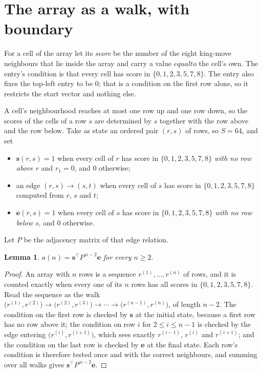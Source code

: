 \documentclass[11pt,a4paper]{article}
\theoremstyle{plain}
\newtheorem{lemma}[theorem]{Lemma}
\theoremstyle{definition}
\begin{document}
\section{The array as a walk, with boundary}

For a cell of the array let its \emph{score} be the number of the eight king-move neighbours that lie inside
the array and carry a value $equal to$ the cell's own. The entry's condition is that every cell
has score in $\{0,1,2,3,5,7,8\}$. The entry also fixes the top-left entry to be $0$; that is a condition on the first row alone, so it restricts the start vector and nothing else.

A cell's neighbourhood reaches at most one row up and one row down, so the scores of the
cells of a row $s$ are determined by $s$ together with the row above and the row below.
Take as state an ordered pair $(r,s)$ of rows, so $S=64$, and set
\begin{itemize}
\item $\mathbf{s}(r,s)=1$ when every cell of $r$ has score in $\{0,1,2,3,5,7,8\}$ \emph{with no row
above $r$} and $r_1=0$, and $0$ otherwise;
\item an edge $(r,s)\to(s,t)$ when every cell of $s$ has score in $\{0,1,2,3,5,7,8\}$ computed from
$r$, $s$ and $t$;
\item $\mathbf{e}(r,s)=1$ when every cell of $s$ has score in $\{0,1,2,3,5,7,8\}$ \emph{with no row
below $s$}, and $0$ otherwise.
\end{itemize}
Let $P$ be the adjacency matrix of that edge relation.

\begin{lemma}\label{lem:walk}
$a(n)=\mathbf{s}^{\!\top}P^{\,n-2}\mathbf{e}$ for every $n\ge2$.
\end{lemma}

\begin{proof}
An array with $n$ rows is a sequence $r^{(1)},\dots,r^{(n)}$ of rows, and it is counted
exactly when every one of its $n$ rows has all scores in $\{0,1,2,3,5,7,8\}$. Read the sequence as the
walk $\bigl(r^{(1)},r^{(2)}\bigr)\to\bigl(r^{(2)},r^{(3)}\bigr)\to\cdots\to
\bigl(r^{(n-1)},r^{(n)}\bigr)$, of length $n-2$. The condition on the first row is
checked by $\mathbf{s}$ at the initial state, because a first row has no row above it; the
condition on row $i$ for $2\le i\le n-1$ is checked by the edge entering
$\bigl(r^{(i)},r^{(i+1)}\bigr)$, which sees exactly $r^{(i-1)}$, $r^{(i)}$ and
$r^{(i+1)}$; and the condition on the last row is checked by $\mathbf{e}$ at the final
state. Each row's condition is therefore tested once and with the correct neighbours, and
summing over all walks gives $\mathbf{s}^{\!\top}P^{\,n-2}\mathbf{e}$.
\end{proof}
\end{document}

